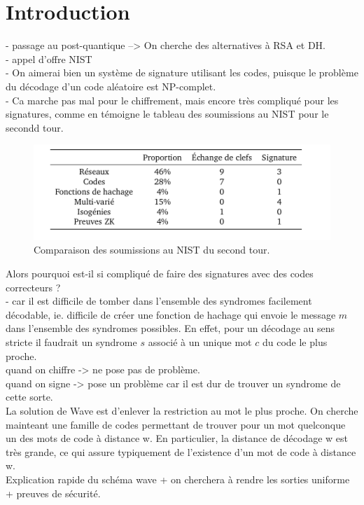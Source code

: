 \documentclass[12pt]{article}
\theoremstyle{plain}
\begin{document}
\section*{Introduction}

- passage au post-quantique --> On cherche des alternatives à RSA et DH.\\
- appel d'offre NIST \\
- On aimerai bien un système de signature utilisant les codes, puisque le problème du décodage d'un code aléatoire est NP-complet. \\
- Ca marche pas mal pour le chiffrement, mais encore très compliqué pour les signatures, comme en témoigne le tableau des soumissions au NIST pour le secondd tour. \\

\begin{figure}[h]
\label{nist 2}
\begin{center}
\includegraphics [scale=0.4]{nist_second_tour.png}
\end{center}
\caption{\small Comparaison des soumissions au NIST du second tour.}
\end{figure}
\noindent Alors pourquoi est-il si compliqué de faire des signatures avec des codes correcteurs ? \\
- car il est difficile de tomber dans l'ensemble des syndromes facilement décodable, ie. difficile de créer une fonction de hachage qui envoie le message $m$ dans l'ensemble des syndromes possibles. En effet, pour un décodage au sens stricte il faudrait un syndrome $s$ associé à un unique mot $c$ du code le plus proche.\\
quand on chiffre -> ne pose pas de problème. \\
quand on signe -> pose un problème car il est dur de trouver un syndrome de cette sorte. \\
La solution de Wave est d'enlever la restriction au mot le plus proche. On cherche mainteant une famille de codes permettant de trouver pour un mot quelconque un des mots de code à distance w. En particulier, la distance de décodage w est très grande, ce qui assure typiquement de l’existence d’un mot de code à distance w.\\
Explication rapide du schéma wave + on cherchera à rendre les sorties uniforme + preuves de sécurité. \\
\end{document}
